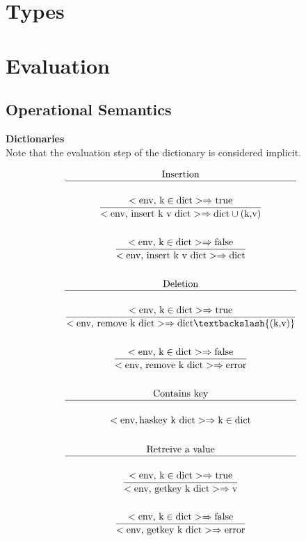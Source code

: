 \documentclass[a4paper, 11pt]{article}
\newcommand{\te}[1]{\text{#1}}
\begin{document}
\begin{multicols}{2}
\section{Types}

\section{Evaluation}
\subsection{Operational Semantics}

\textbf{Dictionaries}\\
Note that the evaluation step of the dictionary is considered implicit.

\begin{gather*}
	\te{Insertion} \\
	\hline \\
	\dfrac{<\te{env, k} \in \te{dict}> \Rightarrow
	\te{true}}{<\te{env, insert k v dict}> \Rightarrow \te{dict} \cup (\te{k,v})} \\ \\
	\dfrac{<\te{env, k} \in \te{dict}> \Rightarrow \te{false}}{<\te{env, insert k v dict}> \Rightarrow \te{dict}} \\ \\
	\te{Deletion} \\ \hline \\
	\dfrac{<\te{env, k} \in \te{dict}> \Rightarrow \te{true}}{<\te{env, remove k dict}> \Rightarrow \te{dict} \textbackslash \{(\te{k,v})\}} \\ \\
	\dfrac{<\te{env, k} \in \te{dict}> \Rightarrow \te{false}}{<\te{env, remove k dict}> \Rightarrow \te{error}} \\ \\
	\te{Contains key} \\ \hline \\
	<\te{env}, \te{haskey k dict}> \Rightarrow \te{k} \in \te{dict} \\ \\
	\te{Retreive a value} \\ \hline \\
	\dfrac{<\te{env, k} \in \te{dict}> \Rightarrow \te{true}}{<\te{env, getkey k dict}> \Rightarrow \te{v}} \\ \\
	\dfrac{<\te{env, k} \in \te{dict}> \Rightarrow \te{false}}{<\te{env, getkey k dict}> \Rightarrow \te{error}} \\ \\

\end{gather*}
\end{multicols}
\end{document}
